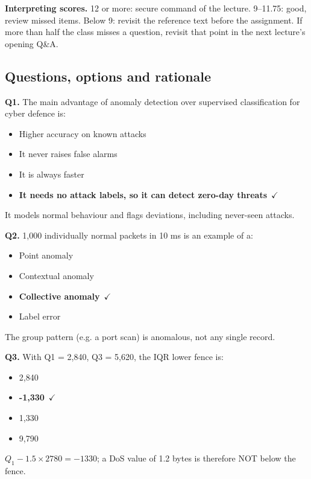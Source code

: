 \documentclass[11pt]{article}
\begin{document}
\textbf{Interpreting scores.} 12 or more: secure command of the lecture. 9--11.75: good, review missed items. Below 9: revisit the reference text before the assignment. If more than half the class misses a question, revisit that point in the next lecture's opening Q\&A.

\subsection*{Questions, options and rationale}

{\small

\noindent\textbf{Q1.} The main advantage of anomaly detection over supervised classification for cyber defence is:\begin{itemize}[leftmargin=2.2em,itemsep=0pt,topsep=1pt]\item[A.] Higher accuracy on known attacks\item[B.] It never raises false alarms\item[C.] It is always faster\item[\textbf{D.}] \textbf{It needs no attack labels, so it can detect zero-day threats}~{\color{GrnN}$\checkmark$}\end{itemize} It models normal behaviour and flags deviations, including never-seen attacks.\par\medskip

\noindent\textbf{Q2.} 1,000 individually normal packets in 10 ms is an example of a:\begin{itemize}[leftmargin=2.2em,itemsep=0pt,topsep=1pt]\item[A.] Point anomaly\item[B.] Contextual anomaly\item[\textbf{C.}] \textbf{Collective anomaly}~{\color{GrnN}$\checkmark$}\item[D.] Label error\end{itemize} The group pattern (e.g. a port scan) is anomalous, not any single record.\par\medskip

\noindent\textbf{Q3.} With Q1 = 2,840, Q3 = 5,620, the IQR lower fence is:\begin{itemize}[leftmargin=2.2em,itemsep=0pt,topsep=1pt]\item[A.] 2,840\item[\textbf{B.}] \textbf{-1,330}~{\color{GrnN}$\checkmark$}\item[C.] 1,330\item[D.] 9,790\end{itemize} $Q_1-1.5\times2780=-1330$; a DoS value of 1.2 bytes is therefore NOT below the fence.\par\medskip

}
\end{document}
